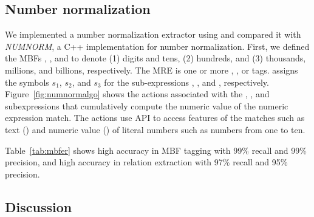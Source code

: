 \vspace{-1em}
\subsection{Number normalization}
\label{subsec:numnorm}

We implemented a number normalization extractor using \framework and 
compared it with {\em NUMNORM}, a 
C++ implementation for number normalization. 
First, we defined the MBFs , , and 
to denote (1) digits and tens, (2) hundreds, and (3) 
thousands, millions, and billions, respectively.
The  MRE 
 is one or more , , or  tags. 
\framework assigns the symbols $s_1$, $s_2$, and $s_3$ 
for the sub-expressions , , and , respectively. 
Figure~\ref{fig:numnormalgo} shows the actions associated with the , , and  subexpressions that cumulatively compute the numeric value of the numeric expression match.
The actions use \framework API to access features of the matches such 
as text () and numeric 
value () of literal numbers such as numbers from one to ten.

Table~\ref{tab:mbfer} shows high accuracy in MBF tagging with 99\% recall and 99\% precision, and
high accuracy in relation extraction with 97\% recall and 95\% precision.

\vspace{-1em}
\subsection{Discussion}
\label{subsec:discuss}

